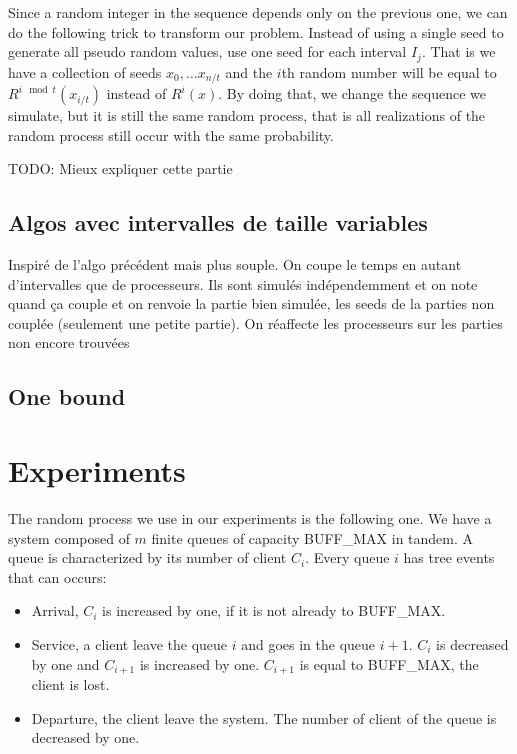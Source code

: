 \documentclass[a4paper,10pt]{article}
\newcommand{\todo}[1]{{\color{red} TODO: {#1}}}
\begin{document}
Since a random integer in the sequence depends only on the previous one, we can do the following trick to transform our problem.
Instead of using a single seed to generate all pseudo random values, use one seed for each interval $I_j$.
That is we have a collection of seeds $x_0, \dots x_{n/t}$ and the $i$th random number will be equal to 
$R^{i \mod t}(x_{i/t})$ instead of $R^i(x)$.
By doing that, we change the sequence we simulate, but it is still the same random process, that is all realizations
of the random process still occur with the same probability. 

\todo{Mieux expliquer cette partie}

\subsection{Algos avec intervalles de taille variables}

Inspiré de l'algo précédent mais plus souple. 
On coupe le temps en autant d'intervalles que de processeurs.
Ils sont simulés indépendemment et on note quand ça couple et on renvoie
la partie bien simulée, les seeds de la parties non couplée (seulement une petite partie). 
On réaffecte les processeurs sur les parties non encore trouvées


\subsection{One bound}


\section{Experiments}

The random process we use in our experiments is the following one. We have a system composed of $m$ finite queues of capacity BUFF\_MAX in tandem. A queue is characterized by its number of client $C_i$.  Every queue $i$ has tree events that can occurs:
\begin{itemize}
\item Arrival, $C_i$ is increased by one, if it is not already to BUFF\_MAX.
\item Service, a client leave the queue $i$ and goes in the queue $i+1$. $C_i$ is decreased by one and $C_{i+1}$ is increased by one. $C_{i+1}$ is equal to BUFF\_MAX, the client is lost.
\item Departure, the client leave the system. The number of client of the queue is decreased by one.
\end{itemize}
\end{document}
